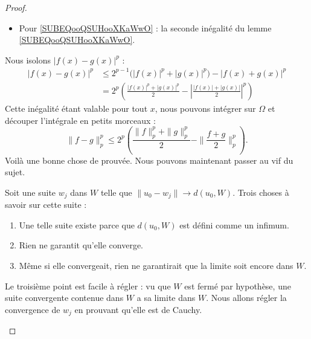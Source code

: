 \begin{proof}
\begin{subproof}
\begin{itemize}
			\item Pour \eqref{SUBEQooQSUHooXKaWwO} : la seconde inégalité du lemme \ref{SUBEQooQSUHooXKaWwO}.
		\end{itemize}
		Nous isolons \( | f(x)-g(x) |^p\) :
		\begin{subequations}
			\begin{align}
				| f(x)-g(x) |^p & \leq 2^{p-1}\big( | f(x) |^p+| g(x) |^p \big)-| f(x)+g(x) |^p                                       \\
				                & =2^p\left( \frac{ | f(x) |^p+| g(x) |^p }{2}-\left| \frac{ | f(x) |+| g(x) | }{2} \right|^p \right)
			\end{align}
		\end{subequations}
		Cette inégalité étant valable pour tout \( x\), nous pouvons intégrer sur \( \Omega\) et découper l'intégrale en petits morceaux :
		\begin{equation}        \label{EQooVNHSooPXjFNC}
			\| f-g \|^p_p\leq 2^p\left( \frac{ \| f \|_p^p+\| g \|_p^p }{2}- \| \frac{ f+g }{2} \|_p^p \right).
		\end{equation}
		Voilà une bonne chose de prouvée. Nous pouvons maintenant passer au vif du sujet.

		Soit une suite \( w_j\) dans \( W\) telle que \( \| u_0-w_j \|\to d(u_0,W)\). Trois choses à savoir sur cette suite :
		\begin{enumerate}
			\item
			      Une telle suite existe parce que \( d(u_0,W)\) est défini comme un infimum.
			\item
			      Rien ne garantit qu'elle converge.
			\item
			      Même si elle convergeait, rien ne garantirait que la limite soit encore dans \( W\).
		\end{enumerate}
		Le troisième point est facile à régler : vu que \( W\) est fermé par hypothèse, une suite convergente contenue dans \( W\) a sa limite dans \( W\). Nous allons régler la convergence de \( w_j\) en prouvant qu'elle est de Cauchy.


\end{subproof}
\end{proof}
